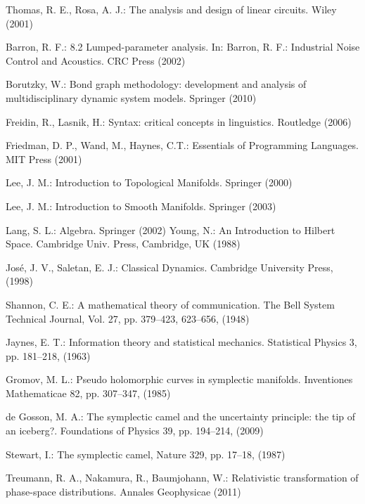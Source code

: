 \documentclass[smallextended]{svjour3}
\numberwithin{equation}{section}
\theoremstyle{definition}
\begin{document}
\begin{thebibliography}{0}
Thomas, R. E., Rosa, A. J.: The analysis and design of linear circuits. Wiley (2001) 

 Barron, R. F.: 8.2 Lumped-parameter analysis. In: Barron, R. F.: Industrial Noise Control and Acoustics. CRC Press (2002)

 Borutzky, W.: Bond graph methodology: development and analysis of multidisciplinary dynamic system models.
Springer (2010) 

 Freidin, R., Lasnik, H.: Syntax: critical concepts in linguistics. Routledge (2006) 

 Friedman, D. P., Wand, M., Haynes, C.T.: Essentials of Programming Languages. MIT Press (2001)

 Lee, J. M.: Introduction to Topological Manifolds. Springer (2000)

 Lee, J. M.: Introduction to Smooth Manifolds. Springer (2003)

 Lang, S. L.: Algebra. Springer (2002)
 Young, N.: An Introduction to Hilbert Space. Cambridge Univ. Press, Cambridge, UK (1988)

 Jos\'{e}, J. V., Saletan, E. J.: Classical Dynamics. Cambridge University Press, (1998)

 Shannon, C. E.: A mathematical theory of communication. The Bell System Technical Journal, Vol. 27, pp. 379--423, 623--656, (1948)

 Jaynes, E. T.: Information theory and statistical mechanics. Statistical Physics 3, pp. 181--218, (1963)

 Gromov, M. L.: Pseudo holomorphic curves in symplectic manifolds. Inventiones Mathematicae 82, pp. 307--347, (1985)

 de Gosson, M. A.: The symplectic camel and the uncertainty principle: the tip of an iceberg?. Foundations of Physics 39, pp. 194--214, (2009)

 Stewart, I.: The symplectic camel, Nature 329, pp. 17--18, (1987)

 Treumann, R. A., Nakamura, R., Baumjohann,  W.: Relativistic transformation of phase-space distributions. Annales Geophysicae (2011)


\end{thebibliography}
\end{document}
